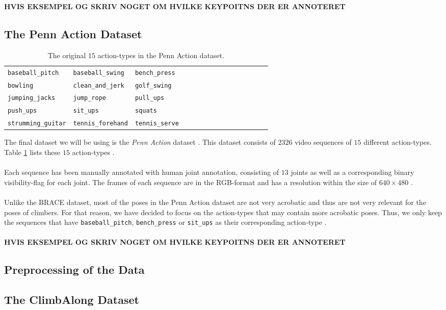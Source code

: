 \documentclass[./main.tex]{subfiles}
\begin{document}
\textbf{HVIS EKSEMPEL OG SKRIV NOGET OM HVILKE KEYPOITNS DER ER ANNOTERET}

\subsection{The Penn Action Dataset}
\begin{table}
    \begin{tabular}[htbp]{lllllllllllllll}
        \texttt{baseball\_pitch} & \texttt{baseball\_swing} & \texttt{bench\_press} \\
        \texttt{bowling} & \texttt{clean\_and\_jerk} & \texttt{golf\_swing} \\
        \texttt{jumping\_jacks} & \texttt{jump\_rope} & \texttt{pull\_ups} \\
        \texttt{push\_ups} & \texttt{sit\_ups} & \texttt{squats} \\
        \texttt{strumming\_guitar} & \texttt{tennis\_forehand} & \texttt{tennis\_serve}
    \end{tabular}
    \caption{The original $15$ action-types in the Penn Action dataset.}
    \label{tab:PA_actions}
\end{table}
The final dataset we will be using is the \textit{Penn Action} dataset \cite{penn_action}. This dataset consists of $2326$ video sequences of $15$ different action-types. Table \ref{tab:PA_actions} lists these $15$ action-types \cite{penn_action}.
\\
\\
Each sequence has been manually annotated with human joint annotation, consisting of $13$ joints as well as a corresponding binary visibility-flag for each joint. The frames of each sequence are in the RGB-format and has a resolution within the size of $640 \times 480$ \cite{penn_action}.
\\
\\
Unlike the BRACE dataset, most of the poses in the Penn Action dataset are not very acrobatic and thus are not very relevant for the poses of climbers. For that reason, we have decided to focus on the action-types that may contain more acrobatic poses. Thus, we only keep the sequences that have \texttt{baseball\_pitch}, \texttt{bench\_press} or \texttt{sit\_ups} as their corresponding action-type \cite{penn_action}.
\\
\\
\textbf{HVIS EKSEMPEL OG SKRIV NOGET OM HVILKE KEYPOITNS DER ER ANNOTERET}

\subsection{Preprocessing of the Data}

\subsection{The ClimbAlong Dataset}
\end{document}
